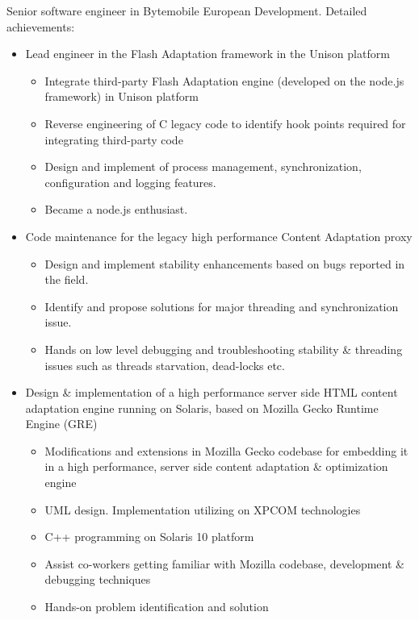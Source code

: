 \documentclass[10pt,a4paper]{moderncv}        %
\begin{document}
{Senior software engineer in Bytemobile European Development.\newline{}%
Detailed achievements:%
\begin{itemize}%
  \item Lead engineer in the Flash Adaptation framework in the Unison platform
  \begin{itemize}%
    \item	Integrate third-party Flash Adaptation engine 
    (developed on the node.js framework) in Unison platform
    \item	Reverse engineering of C legacy code to identify hook points required for integrating third-party code
    \item	Design and implement of process management, synchronization, configuration and logging features.
    \item	Became a node.js enthusiast.
  \end{itemize}
  \item Code maintenance for the legacy high performance Content Adaptation proxy
  \begin{itemize}%
    \item Design and implement stability enhancements based on bugs reported in the field.
    \item Identify and propose solutions for major threading and synchronization issue.
    \item Hands on low level debugging and troubleshooting stability \& threading issues 
    such as threads starvation, dead-locks etc.
  \end{itemize}
  \item Design \& implementation 
  of a high performance server side HTML content adaptation engine 
  running on Solaris, based on Mozilla Gecko Runtime Engine (GRE)
  \begin{itemize}%
    \item Modifications and extensions in Mozilla Gecko codebase 
    for embedding it in a high performance, server side content adaptation \& optimization engine
    \item UML design. Implementation utilizing on XPCOM technologies
    \item C++ programming on Solaris 10 platform
    \item Assist co-workers getting familiar with Mozilla codebase, development \& debugging techniques
    \item Hands-on problem identification and solution
  \end{itemize}
\end{itemize}}
\end{document}
